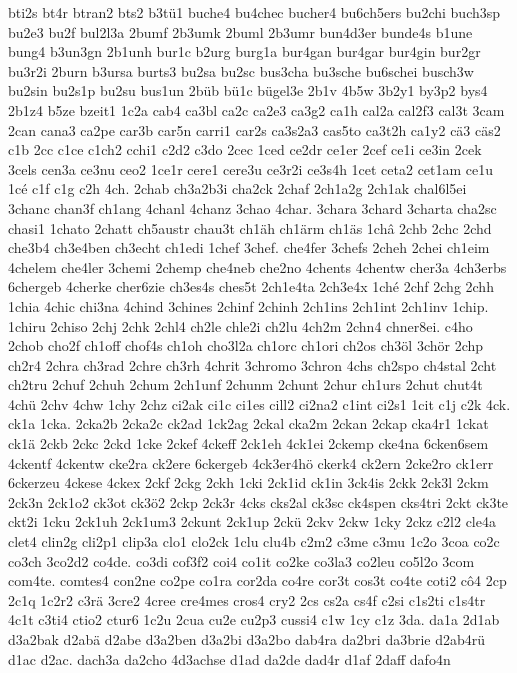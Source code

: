 {bti2s
bt4r
btran2
bts2
b3tü1
buche4
bu4chec
bucher4
bu6ch5ers
bu2chi
buch3sp
bu2e3
bu2f
bul2l3a
2bumf
2b3umk
2buml
2b3umr
bun4d3er
bunde4s
b1une
bung4
b3un3gn
2b1unh
bur1c
b2urg
burg1a
bur4gan
bur4gar
bur4gin
bur2gr
bu3r2i
2burn
b3ursa
burts3
bu2sa
bu2sc
bus3cha
bu3sche
bu6schei
busch3w
bu2sin
bu2s1p
bu2su
bus1un
2büb
bü1c
bügel3e
2b1v
4b5w
3b2y1
by3p2
bys4
2b1z4
b5ze
bzeit1
1c2a
cab4
ca3bl
ca2c
ca2e3
ca3g2
ca1h
cal2a
cal2f3
cal3t
3cam
2can
cana3
ca2pe
car3b
car5n
carri1
car2s
ca3s2a3
cas5to
ca3t2h
ca1y2
cä3
cäs2
c1b
2cc
c1ce
c1ch2
cchi1
c2d2
c3do
2cec
1ced
ce2dr
ce1er
2cef
ce1i
ce3in
2cek
3cels
cen3a
ce3nu
ceo2
1ce1r
cere1
cere3u
ce3r2i
ce3s4h
1cet
ceta2
cet1am
ce1u
1cé
c1f
c1g
c2h
4ch.
2chab
ch3a2b3i
cha2ck
2chaf
2ch1a2g
2ch1ak
chal6l5ei
3chanc
chan3f
ch1ang
4chanl
4chanz
3chao
4char.
3chara
3chard
3charta
cha2sc
chasi1
1chato
2chatt
ch5austr
chau3t
ch1äh
ch1ärm
ch1äs
1châ
2chb
2chc
2chd
che3b4
ch3e4ben
ch3echt
ch1edi
1chef
3chef.
che4fer
3chefs
2cheh
2chei
ch1eim
4chelem
che4ler
3chemi
2chemp
che4neb
che2no
4chents
4chentw
cher3a
4ch3erbs
6chergeb
4cherke
cher6zie
ch3es4s
ches5t
2ch1e4ta
2ch3e4x
1ché
2chf
2chg
2chh
1chia
4chic
chi3na
4chind
3chines
2chinf
2chinh
2ch1ins
2ch1int
2ch1inv
1chip.
1chiru
2chiso
2chj
2chk
2chl4
ch2le
chle2i
ch2lu
4ch2m
2chn4
chner8ei.
c4ho
2chob
cho2f
ch1off
chof4s
ch1oh
cho3l2a
ch1orc
ch1ori
ch2os
ch3öl
3chör
2chp
ch2r4
2chra
ch3rad
2chre
ch3rh
4chrit
3chromo
3chron
4chs
ch2spo
ch4stal
2cht
ch2tru
2chuf
2chuh
2chum
2ch1unf
2chunm
2chunt
2chur
ch1urs
2chut
chut4t
4chü
2chv
4chw
1chy
2chz
ci2ak
ci1c
ci1es
cill2
ci2na2
c1int
ci2s1
1cit
c1j
c2k
4ck.
ck1a
1cka.
2cka2b
2cka2c
ck2ad
1ck2ag
2ckal
cka2m
2ckan
2ckap
cka4r1
1ckat
ck1ä
2ckb
2ckc
2ckd
1cke
2ckef
4ckeff
2ck1eh
4ck1ei
2ckemp
cke4na
6cken6sem
4ckentf
4ckentw
cke2ra
ck2ere
6ckergeb
4ck3er4hö
ckerk4
ck2ern
2cke2ro
ck1err
6ckerzeu
4ckese
4ckex
2ckf
2ckg
2ckh
1cki
2ck1id
ck1in
3ck4is
2ckk
2ck3l
2ckm
2ck3n
2ck1o2
ck3ot
ck3ö2
2ckp
2ck3r
4cks
cks2al
ck3sc
ck4spen
cks4tri
2ckt
ck3te
ckt2i
1cku
2ck1uh
2ck1um3
2ckunt
2ck1up
2ckü
2ckv
2ckw
1cky
2ckz
c2l2
cle4a
clet4
clin2g
cli2p1
clip3a
clo1
clo2ck
1clu
clu4b
c2m2
c3me
c3mu
1c2o
3coa
co2c
co3ch
3co2d2
co4de.
co3di
cof3f2
coi4
co1it
co2ke
co3la3
co2leu
co5l2o
3com
com4te.
comtes4
con2ne
co2pe
co1ra
cor2da
co4re
cor3t
cos3t
co4te
coti2
cô4
2cp
2c1q
1c2r2
c3rä
3cre2
4cree
cre4mes
cros4
cry2
2cs
cs2a
cs4f
c2si
c1s2ti
c1s4tr
4c1t
c3ti4
ctio2
ctur6
1c2u
2cua
cu2e
cu2p3
cussi4
c1w
1cy
c1z
3da.
da1a
2d1ab
d3a2bak
d2abä
d2abe
d3a2ben
d3a2bi
d3a2bo
dab4ra
da2bri
da3brie
d2ab4rü
d1ac
d2ac.
dach3a
da2cho
4d3achse
d1ad
da2de
dad4r
d1af
2daff
dafo4n
}
